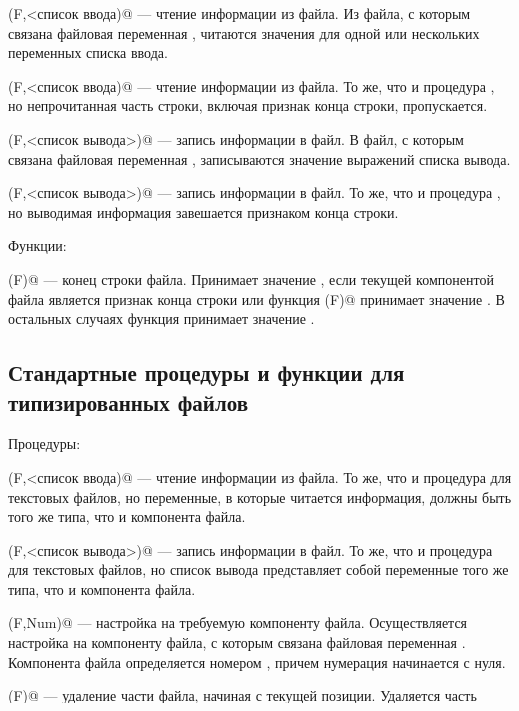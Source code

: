\documentclass[12pt,a4paper]{article}
\theoremstyle{plain}
\theoremstyle{definition}
\theoremstyle{remark}
\begin{document}
\verb@Read(F,<список ввода)@ --- чтение информации из файла. Из файла, с которым связана файловая переменная \verb@F@, читаются значения для одной или нескольких переменных списка ввода.

\verb@ReadLn(F,<список ввода)@ --- чтение информации из файла. То же, что и процедура \verb@read@, но непрочитанная часть строки, включая признак конца строки, пропускается.

\verb@Write(F,<список вывода>)@ --- запись информации в файл. В файл, с которым связана файловая переменная \verb@F@, записываются значение выражений списка вывода.

\verb@WriteLn(F,<список вывода>)@ --- запись информации в файл. То же, что и процедура \verb@write@, но выводимая информация завешается признаком конца строки.

Функции:

\verb@Eoln(F)@ --- конец строки файла. Принимает значение \verb@true@, если текущей компонентой файла является признак конца строки или функция \verb@eof(F)@ принимает значение \verb@true@. В остальных случаях функция принимает значение \verb@false@.

\subsection{Стандартные процедуры и функции для типизированных файлов}

Процедуры:

\verb@Read(F,<список ввода)@ --- чтение информации из файла. То же, что и процедура \verb@read@ для текстовых файлов, но переменные, в которые читается информация, должны быть того же типа, что и компонента файла. 

\verb@Write(F,<список вывода>)@ --- запись информации в файл. То же, что и процедура \verb@write@ для текстовых файлов, но список вывода представляет собой переменные того же типа, что и компонента файла.

\verb@Seek(F,Num)@ --- настройка на требуемую компоненту файла. Осуществляется настройка на компоненту файла, с которым связана файловая переменная \verb@F@. Компонента файла определяется номером \verb@Num@, причем нумерация начинается с нуля.

\verb@Truncate(F)@ --- удаление части файла, начиная с текущей позиции.  Удаляется часть файла, начиная с текущей позиции и до его конца.

Функции:

\verb@FilePos(F)@ --- номер текущей компоненты файла. Функция возвращает номер текущей компоненты файла, с которым связана файловая переменная \verb@F@. Нумерация начинается с нуля. 
\end{document}
